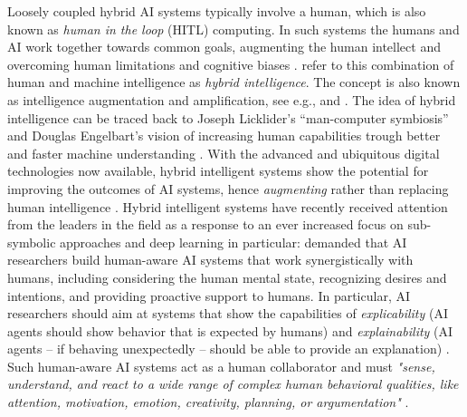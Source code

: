 Loosely coupled hybrid AI systems typically involve a human, which is also known as \textit{human in the loop} (HITL)
computing. In such systems the humans and AI work together towards common goals, augmenting the human intellect and
overcoming human limitations and cognitive biases \citep{akataResearchAgendaHybrid2020}. \cite{akataResearchAgendaHybrid2020}
refer to this combination of human and machine intelligence as \textit{hybrid intelligence}. The concept is also known as
intelligence augmentation and amplification, see e.g., \cite{schmidtAugmentingHumanIntellect2017} and
\cite{zhouIntelligenceAugmentationBuilding2021}. The idea of hybrid intelligence can be traced back to Joseph Licklider's
``man-computer symbiosis'' and Douglas Engelbart's vision of increasing human capabilities trough better and faster machine
understanding \citep[and references cited therein]{schmidtAugmentingHumanIntellect2017}. With the advanced and ubiquitous
digital technologies now available, hybrid intelligent systems show the potential for improving the outcomes of AI systems, 
hence \textit{augmenting} rather than replacing human intelligence \citep{schmidtAugmentingHumanIntellect2017,akataResearchAgendaHybrid2020}.
Hybrid intelligent systems have recently received attention from the leaders in the field as a response to an ever increased
focus on sub-symbolic approaches and deep learning in particular: \cite{kambhampatiChallengesHumanAwareAI2020} demanded that
AI researchers build human-aware AI systems that work synergistically with humans, including considering the human mental state,
recognizing desires and intentions, and providing proactive support to humans. In particular, AI researchers should aim
at systems that show the capabilities of \textit{explicability} (AI agents should show behavior that is expected by
humans) and \textit{explainability} (AI agents -- if behaving unexpectedly -- should be able to provide an explanation)
\citep{kambhampatiChallengesHumanAwareAI2020}. Such human-aware AI systems act as a human collaborator and must \textit{"sense,
understand, and react to a wide range of complex human behavioral qualities, like attention, motivation, emotion, creativity,
planning, or argumentation"} \citep{kortelingHumanArtificialIntelligence2021}.

